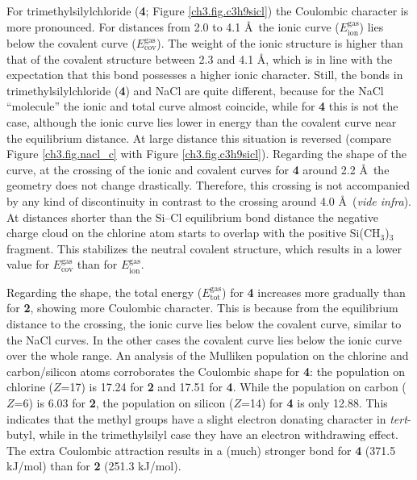 For trimethylsilylchloride (\textbf{4}; Figure \ref{ch3.fig.c3h9sicl}) the Coulombic character is more pronounced. For distances from 2.0 to 4.1 \AA\  the ionic curve ($E_\mathrm{ion}^\mathrm{gas}$) lies below the covalent curve ($E_\mathrm{cov}^\mathrm{gas}$). The weight of the ionic structure is higher than that of the covalent structure between 2.3 and 4.1 \AA, which is in line with the expectation that this bond possesses a higher ionic character. Still, the bonds in trimethylsilylchloride (\textbf{4}) and NaCl are quite different, because for the NaCl ``molecule'' the ionic and total curve almost coincide, while for \textbf{4} this is not the case, although the ionic curve lies lower in energy than the covalent curve near the equilibrium distance. At large distance this situation is reversed (compare Figure \ref{ch3.fig.nacl_c} with Figure \ref{ch3.fig.c3h9sicl}). Regarding the shape of the curve, at the crossing of the ionic and covalent curves for \textbf{4} around 2.2 \AA\ the geometry does not change drastically. Therefore, this crossing is not accompanied by any kind of discontinuity in contrast to the crossing around 4.0 \AA\ (\textit{vide infra}). At distances shorter than the Si--Cl equilibrium bond distance the negative charge cloud on the chlorine atom starts to overlap with the positive Si(CH$_3$)$_3$ fragment. This stabilizes the neutral covalent structure, which results in a lower value for $E_\mathrm{cov}^\mathrm{gas}$ than for $E_\mathrm{ion}^\mathrm{gas}$. 

Regarding the shape, the total energy ($E_\mathrm{tot}^\mathrm{gas}$) for \textbf{4} increases more gradually than for \textbf{2}, showing more Coulombic character. This is because from the equilibrium distance to the crossing, the ionic curve lies below the covalent curve, similar to the NaCl curves. In the other cases the covalent curve lies below the ionic curve over the whole range. An analysis of the Mulliken population on the chlorine and carbon/silicon atoms corroborates the Coulombic shape for \textbf{4}: the population on chlorine ($Z$=17) is 17.24 for \textbf{2} and 17.51 for \textbf{4}. While the population on carbon ($Z$=6) is 6.03 for \textbf{2}, the population on silicon ($Z$=14) for \textbf{4} is only 12.88. This indicates that the methyl groups have a slight electron donating character in \textit{tert}-butyl, while in the trimethylsilyl case they have an electron withdrawing effect. The extra Coulombic attraction results in a (much) stronger bond for \textbf{4} (371.5 kJ/mol) than for \textbf{2} (251.3 kJ/mol). 

